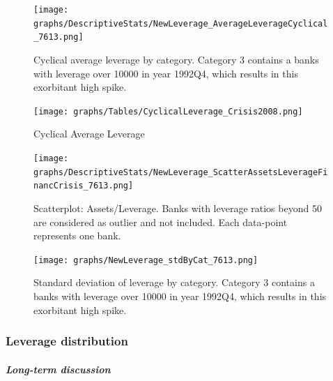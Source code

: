 \documentclass[12pt, a4paper]{article} %
\begin{document}
\begin{figure}[H]
\begin{minipage}{\textwidth}
\centering
\texttt{[image: graphs/DescriptiveStats/NewLeverage\_AverageLeverageCyclical\_7613.png]}
\caption[1]{Cyclical average leverage by category. Category 3 contains a banks with leverage over 10000 in year 1992Q4, which results in this exorbitant high spike.}
\label{fig:averageLeverage_cyclical_Categories}
\end{minipage}
\end{figure}

\begin{figure}[H]
\begin{minipage}{\textwidth}
\centering
\texttt{[image: graphs/Tables/CyclicalLeverage\_Crisis2008.png]}
\caption[1]{Cyclical Average Leverage}
\label{table:CyclicalLeverageFinancCrisis}
\end{minipage}
\end{figure}

\begin{figure}[H]
\begin{minipage}{\textwidth}
\centering
\texttt{[image: graphs/DescriptiveStats/NewLeverage\_ScatterAssetsLeverageFinancCrisis\_7613.png]}
\caption[1]{Scatterplot: Assets/Leverage. Banks with leverage ratios beyond 50 are considered as outlier and not included. Each data-point represents one bank.}
\label{fig:AssetsvsLeverageFinancCrisis}
\end{minipage}
\end{figure}


\begin{figure}[H]
\begin{minipage}{\textwidth}
\centering
\texttt{[image: graphs/NewLeverage\_stdByCat\_7613.png]}
\caption[1]{Standard deviation of leverage by category. Category 3 contains a banks with leverage over 10000 in year 1992Q4, which results in this exorbitant high spike.}
\label{fig:averageLeverage_Std_Categories}
\end{minipage}
\end{figure}

\subsubsection{Leverage distribution}
\label{sec:LeverageDistribution}

\subparagraph{Long-term discussion}
\end{document}
